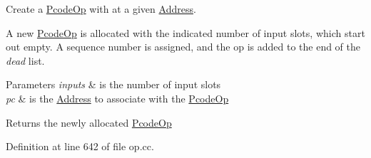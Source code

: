 Create a \mbox{\hyperlink{class_pcode_op}{Pcode\+Op}} with at a given \mbox{\hyperlink{class_address}{Address}}. 

A new \mbox{\hyperlink{class_pcode_op}{Pcode\+Op}} is allocated with the indicated number of input slots, which start out empty. A sequence number is assigned, and the op is added to the end of the {\itshape dead} list. 
\begin{DoxyParams}{Parameters}
{\em inputs} & is the number of input slots \\
\hline
{\em pc} & is the \mbox{\hyperlink{class_address}{Address}} to associate with the \mbox{\hyperlink{class_pcode_op}{Pcode\+Op}} \\
\hline
\end{DoxyParams}
\begin{DoxyReturn}{Returns}
the newly allocated \mbox{\hyperlink{class_pcode_op}{Pcode\+Op}} 
\end{DoxyReturn}


Definition at line 642 of file op.\+cc.

